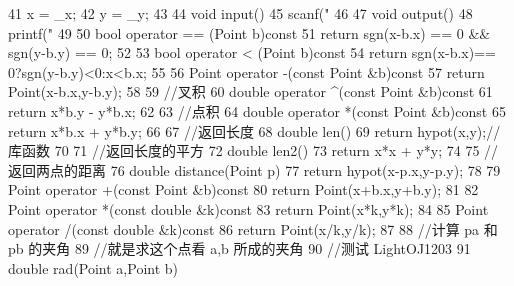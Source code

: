 \documentclass[11pt]{article}
\begin{document}
\begin{Code}
{{41              x = _x;
42              y = _y;
43       }
44       void input(){
45           scanf("%
46       }
47       void output(){
48           printf("%
49       }
50       bool operator == (Point b)const{
51           return sgn(x-b.x) == 0 && sgn(y-b.y) == 0;
52       }
53       bool operator < (Point b)const{
54           return sgn(x-b.x)== 0?sgn(y-b.y)<0:x<b.x;
55       }
56       Point operator -(const Point &b)const{
57           return Point(x-b.x,y-b.y);
58       }
59       //叉积
60       double operator ^(const Point &b)const{
61           return x*b.y - y*b.x;
62       }
63       //点积
64       double operator *(const Point &b)const{
65           return x*b.x + y*b.y;
66       }
67       //返回长度
68       double len(){
69           return hypot(x,y);//库函数
70       }
71       //返回长度的平方
72       double len2(){
73           return x*x + y*y;
74       }
75       //返回两点的距离
76       double distance(Point p){
77           return hypot(x-p.x,y-p.y);
78       }
79       Point operator +(const Point &b)const{
80           return Point(x+b.x,y+b.y);
81       }
82       Point operator *(const double &k)const{
83           return Point(x*k,y*k);
84       }
85       Point operator /(const double &k)const{
86           return Point(x/k,y/k);
87       }
88       //计算 pa 和 pb 的夹角
89       //就是求这个点看 a,b 所成的夹角
90       //测试 LightOJ1203
91       double rad(Point a,Point b){


}}
\end{Code}
\end{document}
